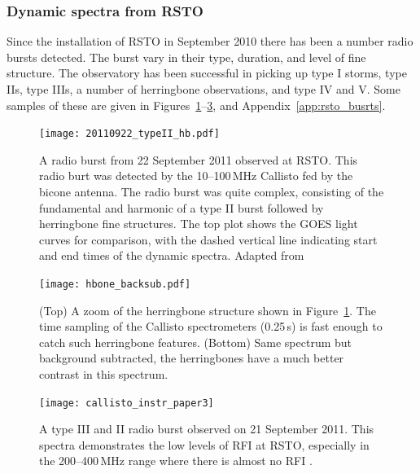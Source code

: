 \subsubsection{Dynamic spectra from RSTO}

Since the installation of RSTO in September 2010 there has been a number radio bursts detected. The burst vary in their type, duration, and level of fine structure. The observatory has been successful in picking up type I storms, type IIs, type IIIs, a number of herringbone observations, and type IV and V. Some samples of these are given in Figures~\ref{fig:typeII_hb}--\ref{fig:type_III}, and Appendix~\ref{app:rsto_busrts}.
\begin{figure}[!t]
\begin{center}
\texttt{[image: 20110922\_typeII\_hb.pdf]}
\caption[Callisto observations type II and herringbones]{A radio burst from 22 September 2011 observed at RSTO. This radio burt was detected by the 10--100\,MHz Callisto fed by the bicone antenna. The radio burst was quite complex, consisting of the fundamental and harmonic of a type II burst followed by herringbone fine structures. The top plot shows the GOES light curves for comparison, with the dashed vertical line indicating start and end times of the dynamic spectra. Adapted from \citep{zucca2012}}
\label{fig:typeII_hb}
\end{center}

\end{figure}
\begin{figure}[!t]
\begin{center}
\texttt{[image: hbone\_backsub.pdf]}
\caption[Callisto observations type II and herringbones]{(Top) A zoom of the herringbone structure shown in Figure~\ref{fig:typeII_hb}. The time sampling of the Callisto spectrometers (0.25\,s) is fast enough to catch such herringbone features. (Bottom) Same spectrum but background subtracted, the herringbones have a much better contrast in this spectrum.}
\label{fig:herringbones}
\end{center}
\end{figure}
\begin{figure}[!t]
\begin{center}
\texttt{[image: callisto\_instr\_paper3]}
\caption[Callisto observations type II and herringbones]{A type III and II radio burst observed on 21 September 2011. This spectra demonstrates the low levels of RFI at RSTO, especially in the 200--400\,MHz range where there is almost no RFI \citep{zucca2012}.}
\label{fig:type_III}
\end{center}
\end{figure}

